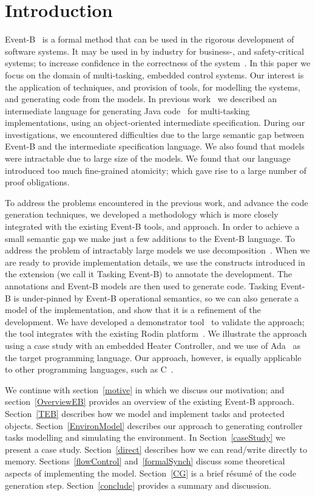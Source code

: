 \section{Introduction}
Event-B~\cite{ ABR10} is a formal method that can be used in the rigorous development of software systems. It may be used in by industry for business-, and safety-critical systems; to increase confidence in the correctness of the system~\cite{Russo2009,MetayerC08}. In this paper we focus on the domain of multi-tasking, embedded control systems. Our interest is the application of techniques, and provision of tools, for modelling the systems, and generating code from the models. In previous work~\cite{Edmunds2009, Edmunds2008, ae2010a} we described an intermediate language for generating Java code~\cite{JavaSpec} for multi-tasking implementations, using an object-oriented intermediate specification. During our investigations, we encountered difficulties due to the large semantic gap between Event-B and the intermediate specification language. We also found that models were intractable due to large size of the models. We found that our language introduced too much fine-grained atomicity; which gave rise to a large number of proof obligations.

To address the problems encountered in the previous work, and advance the code generation techniques, we developed a methodology which is more closely integrated with the existing Event-B tools, and approach. In order to achieve a small semantic gap we make just a few additions to the Event-B language. To address the problem of intractably large models we use decomposition~\cite{Butler09a, decomp2010b}. When we are ready to provide implementation details, we use the constructs introduced in the extension (we call it Tasking Event-B) to annotate the development. The annotations and Event-B models are then used to generate code. Tasking Event-B is under-pinned by Event-B operational semantics, so we can also generate a model of the implementation, and show that it is a refinement of the development. We have developed a demonstrator tool~\cite{CGTools} to validate the approach; the tool integrates with the existing Rodin platform~\cite{RodinTool}. We illustrate the approach using a case study with an embedded Heater Controller, and we use of Ada~\cite{ada2005} as the target programming language. Our approach, however, is equally applicable to other programming languages, such as C~\cite{KernighanR88}. 

We continue with section~\ref{motive} in which we discuss our motivation; and section~\ref{OverviewEB} provides an overview of the existing Event-B approach.
Section~\ref{TEB} describes how we model and implement tasks and protected objects. Section~\ref{EnvironModel} describes our approach to generating controller tasks modelling and simulating the environment. 
In Section~\ref{caseStudy} we present a case study. 
Section~\ref{direct} describes how we can read/write directly to memory.
Sections~\ref{flowControl} and~\ref{formalSynch} discuss some theoretical aspects of implementing the model.
Section~\ref{CG} is a brief r\'esum\'e of the code generation step.
Section~\ref{conclude} provides a summary and discussion.

